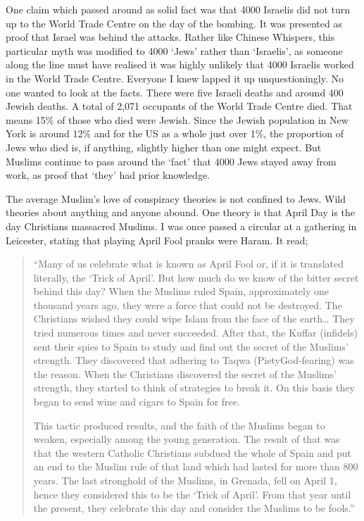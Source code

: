 \documentclass[12pt]{memoir}
\begin{document}
One claim which passed around as solid fact was that 4000 Israelis
did not turn up to the World Trade Centre on the day of the bombing.
It was presented as proof that Israel was behind the attacks.
Rather like Chinese Whispers, this particular myth was modified
to 4000 ‘Jews’ rather than ‘Israelis’,
as someone along the line must have realised
it was highly unlikely that 4000 Israelis worked in the World Trade Centre.
Everyone I knew lapped it up unquestioningly.
No one wanted to look at the facts.
There were five Israeli deaths and around 400 Jewish deaths.
A total of 2,071 occupants of the World Trade Centre died.
That means 15\% of those who died were Jewish.
Since the Jewish population in New York is around 12\%
and for the US as a whole just over 1\%,
the proportion of Jews who died is, if anything,
slightly higher than one might expect.
But Muslims continue to pass around the ‘fact’
that 4000 Jews stayed away from work,
as proof that ‘they’ had prior knowledge.

The average Muslim’s love of conspiracy theories is not confined to Jews.
Wild theories about anything and anyone abound.
One theory is that April  Day
is the day Christians massacred Muslims.
I was once passed a circular at a gathering in Leicester,
stating that playing April Fool pranks were Haram.
It read;

\begin{quote}
“Many of us celebrate what is known as April Fool or,
if it is translated literally, the ‘Trick of April’.
But how much do we know of the bitter secret behind this day?
When the Muslims ruled Spain, approximately one thousand years ago,
they were a force that could not be destroyed.
The Christians wished they could wipe Islam from the face of the earth…
They tried numerous times and never succeeded.
After that, the Kuffar (infidels) sent their spies to Spain
to study and find out the secret of the Muslims’ strength.
They discovered that adhering to Taqwa (Piety\/God-fearing) was the reason.
When the Christians discovered the secret of the Muslims’ strength,
they started to think of strategies to break it.
On this basis they began to send wine and cigars to Spain for free.

This tactic produced results, and the faith of the Muslims began to weaken,
especially among the young generation.
The result of that was that the western Catholic Christians subdued
the whole of Spain and put an end to the Muslim rule of that land
which had lasted for more than 800 years.
The last stronghold of the Muslims, in Grenada, fell on April 1,
hence they considered this to be the ‘Trick of April’.
From that year until the present,
they celebrate this day and consider the Muslims to be fools.”
\end{quote}
\end{document}
